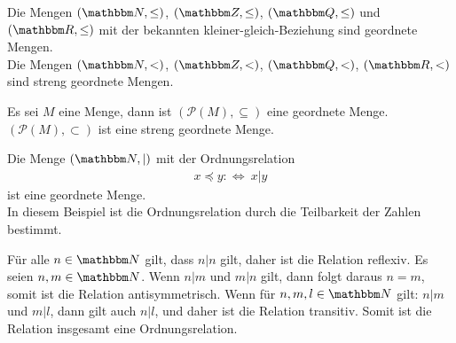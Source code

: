 \begin{Unit}[Beispiel] 
  Die Mengen $(\NN, \leq)$, $(\ZZ, \leq)$, $(\QQ, \leq)$ und $(\RR, \leq)$ 
  mit der bekannten kleiner-gleich-Beziehung sind geordnete Mengen. \\
  Die Mengen $(\NN, <)$, $(\ZZ, <)$, $(\QQ, <)$, $(\RR, <)$ sind streng 
  geordnete Mengen.
\end{Unit}

\begin{Unit}[Beispiel] 
  Es sei $M$ eine Menge, dann ist $(\mathcal{P}(M), \subseteq)$ eine geordnete 
  Menge. $(\mathcal{P}(M), \subset)$ ist eine streng geordnete Menge.
\end{Unit}

\begin{Unit}[Beispiel] 
  Die Menge $(\NN, |)$ mit der Ordnungsrelation
  \begin{align}
    x \preceq y : \Leftrightarrow\ x|y
  \end{align}
  ist eine geordnete Menge. \\
  In diesem Beispiel ist die Ordnungsrelation durch die Teilbarkeit der 
  Zahlen bestimmt.
\end{Unit}

\begin{Unit}[Beispiel]
  Für alle $n \in \NN$ gilt, dass $n|n$ gilt, daher ist die Relation reflexiv. 
  Es seien $n,m \in \NN$. Wenn $n|m$ und $m|n$ gilt, dann folgt daraus 
  $n = m$, somit ist die Relation antisymmetrisch. Wenn für $n,m,l \in \NN$ 
  gilt: $n|m$ und $m|l$, dann gilt auch $n|l$, und daher ist die Relation 
  transitiv. Somit ist die Relation insgesamt eine Ordnungsrelation.
\end{Unit}

